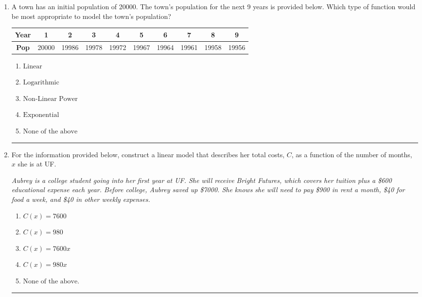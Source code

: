 \documentclass[14pt]{extbook}
\newcommand{\litem}[1]{\item#1\hspace*{-1cm}\rule{\textwidth}{0.4pt}}
\begin{document}
\begin{enumerate}
\litem{
A town has an initial population of 20000. The town's population for the next 9 years is provided below. Which type of function would be most appropriate to model the town's population?

\begin{tabular}{c|c|c|c|c|c|c|c|c|c}
\textbf{Year} &1 &2 &3 &4 &5 &6 &7 &8 &9\tabularnewline \hline
\textbf{Pop} &20000 &19986 &19978 &19972 &19967 &19964 &19961 &19958 &19956\end{tabular}\begin{enumerate}[label=\Alph*.]
\item \( \text{Linear} \)
\item \( \text{Logarithmic} \)
\item \( \text{Non-Linear Power} \)
\item \( \text{Exponential} \)
\item \( \text{None of the above} \)

\end{enumerate} }
\litem{
For the information provided below, construct a linear model that describes her total costs, $C$, as a function of the number of months, $x$ she is at UF. 
\begin{center}
    \textit{ Aubrey is a college student going into her first year at UF. She will receive Bright Futures, which covers her tuition plus a \$600 educational expense each year. Before college, Aubrey saved up \$7000. She knows she will need to pay \$900 in rent a month, \$40 for food a week, and \$40 in other weekly expenses. }
\end{center}
\begin{enumerate}[label=\Alph*.]
\item \( C(x) = 7600 \)
\item \( C(x) = 980 \)
\item \( C(x) = 7600 x \)
\item \( C(x) = 980 x \)
\item \( \text{None of the above.} \)


\end{enumerate}}
\end{enumerate}
\end{document}
